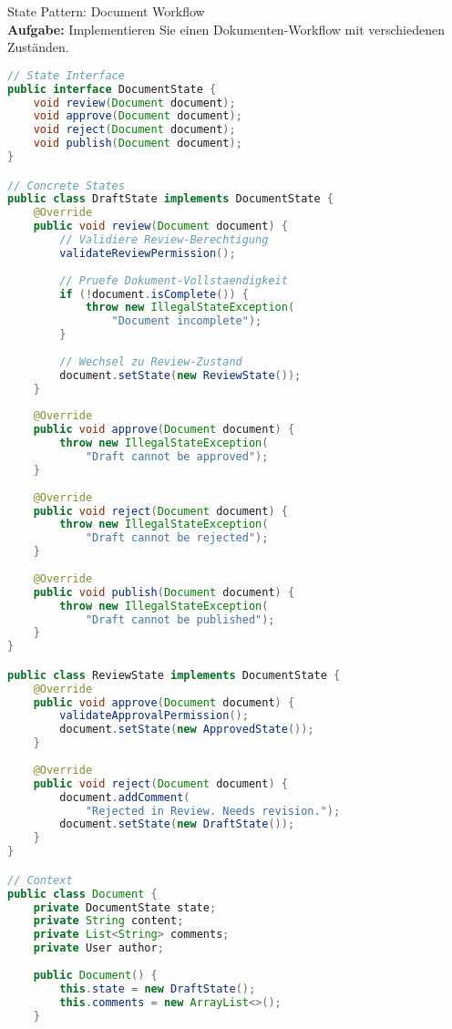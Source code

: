 \begin{example2}{State Pattern: Document Workflow}\\
\textbf{Aufgabe:} Implementieren Sie einen Dokumenten-Workflow mit verschiedenen Zuständen.

\begin{lstlisting}[language=Java, style=basesmol]
// State Interface
public interface DocumentState {
    void review(Document document);
    void approve(Document document);
    void reject(Document document);
    void publish(Document document);
}

// Concrete States
public class DraftState implements DocumentState {
    @Override
    public void review(Document document) {
        // Validiere Review-Berechtigung
        validateReviewPermission();
        
        // Pruefe Dokument-Vollstaendigkeit
        if (!document.isComplete()) {
            throw new IllegalStateException(
                "Document incomplete");
        }
        
        // Wechsel zu Review-Zustand
        document.setState(new ReviewState());
    }
    
    @Override
    public void approve(Document document) {
        throw new IllegalStateException(
            "Draft cannot be approved");
    }
    
    @Override
    public void reject(Document document) {
        throw new IllegalStateException(
            "Draft cannot be rejected");
    }
    
    @Override
    public void publish(Document document) {
        throw new IllegalStateException(
            "Draft cannot be published");
    }
}

public class ReviewState implements DocumentState {
    @Override
    public void approve(Document document) {
        validateApprovalPermission();
        document.setState(new ApprovedState());
    }
    
    @Override
    public void reject(Document document) {
        document.addComment(
            "Rejected in Review. Needs revision.");
        document.setState(new DraftState());
    }
}

// Context
public class Document {
    private DocumentState state;
    private String content;
    private List<String> comments;
    private User author;
    
    public Document() {
        this.state = new DraftState();
        this.comments = new ArrayList<>();
    }
    

\end{lstlisting}
\end{example2}

